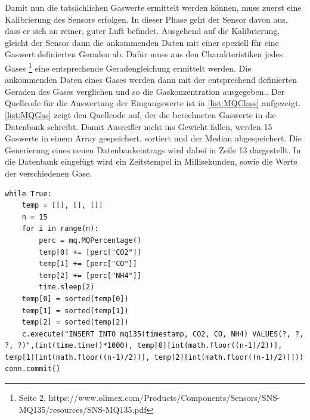 Damit nun die tatsächlichen Gaswerte ermittelt werden können, muss zuerst eine Kalibrierung des Sensors erfolgen. In dieser Phase geht der Sensor davon aus, dass er sich an reiner, guter Luft befindet. Ausgehend auf die Kalibrierung, gleicht der Sensor dann die ankommenden Daten mit einer speziell für eine Gaswert definierten Geraden ab. Dafür muss aus den Charakteristiken jedes Gases \footnote{Seite 2, https://www.olimex.com/Products/Components/Sensors/SNS-MQ135/resources/SNS-MQ135.pdf} eine entsprechende Geradengleichung ermittelt werden. Die ankommenden Daten eines Gases werden dann mit der entsprechend definierten Geraden des Gases verglichen und so die Gaskonzentration ausgegeben.\cite{gas:MQ}. Der Quellcode für die Auswertung der Eingangswerte ist in \autoref{list:MQClass} aufgezeigt.
\\ \autoref{list:MQGas} zeigt den Quellcode auf, der die berechneten Gaswerte in die Datenbank schreibt. Damit Ausreißer nicht ins Gewicht fallen, werden 15 Gaswerte in einem Array gespeichert, sortiert und der Median abgespeichert. Die Generierung eines neuen Datenbankeintrags wird dabei in Zeile 13 dargestellt. In die Datenbank eingefügt wird ein Zeitstempel in Millisekunden, sowie die Werte der verschiedenen Gase.

\begin{lstlisting}[label=list:MQGas, caption={MQ-135 Sensorwerte in DB}]
while True:
	temp = [[], [], []]
	n = 15
	for i in range(n):
		perc = mq.MQPercentage()
		temp[0] += [perc["CO2"]]
		temp[1] += [perc["CO"]]
		temp[2] += [perc["NH4"]]
		time.sleep(2)
	temp[0] = sorted(temp[0])
	temp[1] = sorted(temp[1])
	temp[2] = sorted(temp[2])
	c.execute("INSERT INTO mq135(timestamp, CO2, CO, NH4) VALUES(?, ?, ?, ?)",(int(time.time()*1000), temp[0][int(math.floor((n-1)/2))], temp[1][int(math.floor((n-1)/2))], temp[2][int(math.floor((n-1)/2))]))
conn.commit()
\end{lstlisting}


